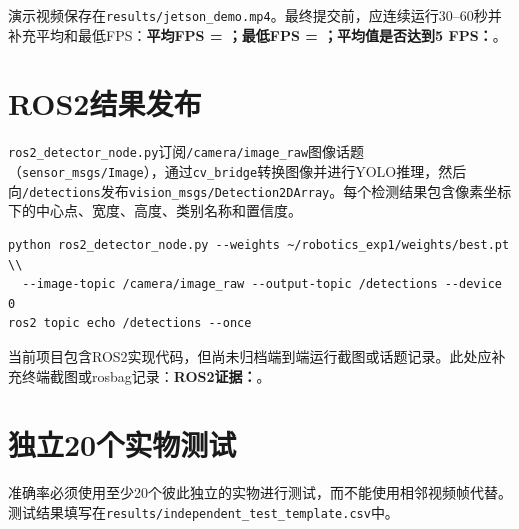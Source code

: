 \documentclass[UTF8,a4paper,12pt]{ctexart}
\begin{document}
演示视频保存在\texttt{results/jetson\_demo.mp4}。最终提交前，应连续运行30--60秒并补充平均和最低FPS：\textbf{平均FPS = \underline{\hspace{2cm}}；最低FPS = \underline{\hspace{2cm}}；平均值是否达到5 FPS：\underline{\hspace{1.5cm}}}。

\section{ROS2结果发布}
\texttt{ros2\_detector\_node.py}订阅\texttt{/camera/image\_raw}图像话题（\texttt{sensor\_msgs/Image}），通过\texttt{cv\_bridge}转换图像并进行YOLO推理，然后向\texttt{/detections}发布\texttt{vision\_msgs/Detection2DArray}。每个检测结果包含像素坐标下的中心点、宽度、高度、类别名称和置信度。

\begin{lstlisting}[caption={ROS2验证命令}]
python ros2_detector_node.py --weights ~/robotics_exp1/weights/best.pt \\
  --image-topic /camera/image_raw --output-topic /detections --device 0
ros2 topic echo /detections --once
\end{lstlisting}

当前项目包含ROS2实现代码，但尚未归档端到端运行截图或话题记录。此处应补充终端截图或rosbag记录：\textbf{ROS2证据：\underline{\hspace{7cm}}}。

\section{独立20个实物测试}
准确率必须使用至少20个彼此独立的实物进行测试，而不能使用相邻视频帧代替。测试结果填写在\texttt{results/independent\_test\_template.csv}中。
\end{document}
